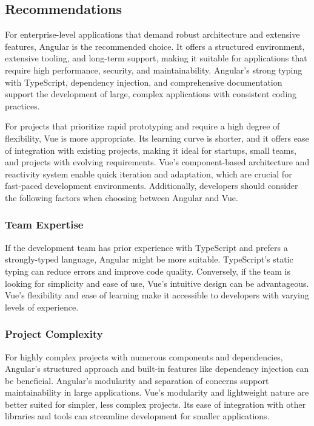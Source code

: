 \documentclass[conference]{IEEEtran}
\begin{document}
\subsection{Recommendations}
For enterprise-level applications that demand robust architecture and extensive features, Angular is the recommended choice. It offers a structured environment, extensive tooling, and long-term support, making it suitable for applications that require high performance, security, and maintainability. Angular’s strong typing with TypeScript, dependency injection, and comprehensive documentation support the development of large, complex applications with consistent coding practices.

For projects that prioritize rapid prototyping and require a high degree of flexibility, Vue is more appropriate. Its learning curve is shorter, and it offers ease of integration with existing projects, making it ideal for startups, small teams, and projects with evolving requirements. Vue’s component-based architecture and reactivity system enable quick iteration and adaptation, which are crucial for fast-paced development environments.
Additionally, developers should consider the following factors when choosing between Angular and Vue.
\newline\subsubsection{Team Expertise} If the development team has prior experience with TypeScript and prefers a strongly-typed language, Angular might be more suitable. TypeScript's static typing can reduce errors and improve code quality. Conversely, if the team is looking for simplicity and ease of use, Vue's intuitive design can be advantageous. Vue’s flexibility and ease of learning make it accessible to developers with varying levels of experience.
\newline\subsubsection{Project Complexity} For highly complex projects with numerous components and dependencies, Angular’s structured approach and built-in features like dependency injection can be beneficial. Angular’s modularity and separation of concerns support maintainability in large applications. Vue’s modularity and lightweight nature are better suited for simpler, less complex projects. Its ease of integration with other libraries and tools can streamline development for smaller applications.
\end{document}
